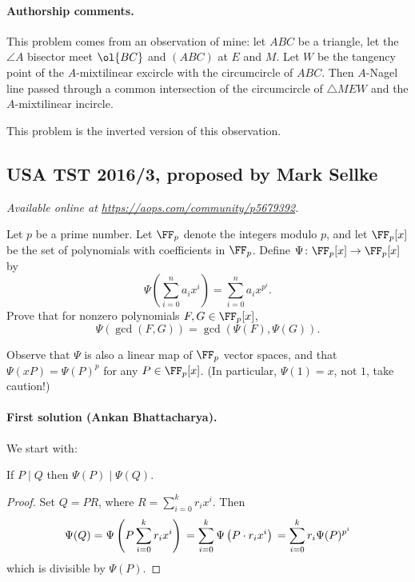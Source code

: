 \documentclass[11pt]{scrartcl}
\begin{document}
\paragraph{Authorship comments.}
This problem comes from an observation of mine:
let $ABC$ be a triangle,
let the $\angle A$ bisector meet $\ol{BC}$ and $(ABC)$ at $E$ and $M$.
Let $W$ be the tangency point of the $A$-mixtilinear excircle
with the circumcircle of $ABC$.
Then $A$-Nagel line passed through a common intersection
of the circumcircle of $\triangle MEW$
and the $A$-mixtilinear incircle.

This problem is the inverted version of this observation.
\pagebreak

\subsection{USA TST 2016/3, proposed by Mark Sellke}
\textsl{Available online at \url{https://aops.com/community/p5679392}.}
\begin{mdframed}[style=mdpurplebox,frametitle={Problem statement}]
Let $p$ be a prime number. Let $\FF_p$ denote the integers modulo $p$,
and let $\FF_p[x]$ be the set of polynomials with coefficients in $\FF_p$.
Define $\Psi \colon \FF_p[x] \to \FF_p[x]$ by
\[ \Psi\left( \sum_{i=0}^n a_i x^i \right) = \sum_{i=0}^n a_i x^{p^i}. \]
Prove that for nonzero polynomials $F,G \in \FF_p[x]$,
\[ \Psi(\gcd(F,G)) = \gcd(\Psi(F), \Psi(G)). \]
\end{mdframed}
Observe that $\Psi$ is also a linear map of $\FF_p$ vector spaces,
and that $\Psi(xP) = \Psi(P)^p$ for any $P \in \FF_p[x]$.
(In particular, $\Psi(1) = x$, not $1$, take caution!)

\paragraph{First solution (Ankan Bhattacharya).}
We start with:
\begin{claim*}
  If $P \mid Q$ then $\Psi(P) \mid \Psi(Q)$.
\end{claim*}
\begin{proof}
  Set $Q = PR$, where $R = \sum_{i=0}^k r_i x^i$.
  Then
  \[ \Psi(Q) = \Psi\left( P\sum_{i=0}^k r_i x^i \right) \\
    = \sum_{i=0}^k \Psi\left( P \cdot r_i x^i  \right) \\
    = \sum_{i=0}^k r_i \Psi(P)^{p^i} \]
  which is divisible by $\Psi(P)$.
\end{proof}
\end{document}
